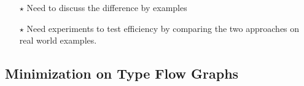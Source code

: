 \documentclass{llncs}
\begin{document}
\begin{itemize}
\item[$\star$] Need to discuss the difference by examples
\item[$\star$] Need experiments to test efficiency by comparing the two approaches on real world examples.
\end{itemize}

\subsection*{Minimization on Type Flow Graphs}

\end{document}
